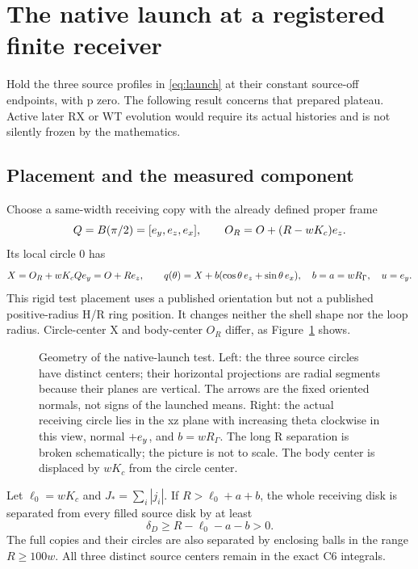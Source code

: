 \section{The native launch at a registered finite receiver}\label{sec:receiver}
Hold the three source profiles in \eqref{eq:launch} at their constant source-off endpoints, with p zero. The following result concerns that prepared plateau. Active later RX or WT evolution would require its actual histories and is not silently frozen by the mathematics.

\subsection{Placement and the measured component}
Choose a same-width receiving copy with the already defined proper frame
\begin{equation}\label{eq:receiverplacement}
Q=B(\pi/2)=[e_y,e_z,e_x],\qquad
O_R=O+(R-wK_c)e_z.
\end{equation}
Its local circle 0 has
\begin{equation}\label{eq:nativecontour}
X=O_R+wK_cQe_y=O+Re_z,\qquad
q(\theta)=X+b(\cos\theta\,e_z+\sin\theta\,e_x),\quad
b=a=wR_\Gamma,\quad u=e_y.
\end{equation}
This rigid test placement uses a published orientation but not a published positive-radius H/R ring position. It changes neither the shell shape nor the loop radius. Circle-center X and body-center \(O_R\) differ, as Figure~\ref{fig:native} shows.

\begin{figure}[tbp]
\centering\resizebox{0.90\textwidth}{!}{}
\caption{Geometry of the native-launch test. Left: the three source circles have distinct centers; their horizontal projections are radial segments because their planes are vertical. The arrows are the fixed oriented normals, not signs of the launched means. Right: the actual receiving circle lies in the xz plane with increasing theta clockwise in this view, normal \(+e_y\), and \(b=wR_\Gamma\). The long R separation is broken schematically; the picture is not to scale. The body center is displaced by \(wK_c\) from the circle center.}\label{fig:native}
\end{figure}

Let \(\ell_0=wK_c\) and \(J_*=\sum_i|j_i|\). If \(R>\ell_0+a+b\), the whole receiving disk is separated from every filled source disk by at least
\begin{equation}\label{eq:clearance}
\delta_D\ge R-\ell_0-a-b>0.
\end{equation}
The full copies and their circles are also separated by enclosing balls in the range \(R\ge100w\). All three distinct source centers remain in the exact C6 integrals.

